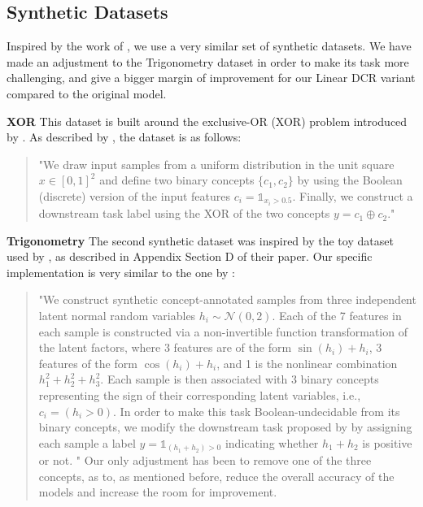 \documentclass[sigconf, nonacm]{acmart}
\begin{document}
\subsection{Synthetic Datasets}
\vspace{2pt}
Inspired by the work of \citet{barbiero2023interpretable}, we use a very similar set of synthetic datasets. We have made an adjustment to the Trigonometry dataset in order to make its task more challenging, and give a bigger margin of improvement for our Linear DCR variant compared to the original model. \vspace{8pt}

\textbf{XOR} This dataset is built around the exclusive-OR (XOR) problem introduced by \citet{minsky1969perceptrons}. As described by \citet{barbiero2023interpretable}, the dataset is as follows:
\begin{quote}
"We draw input samples from a uniform distribution in the unit square \( x \in [0, 1]^2 \) and define two binary concepts \(\{c_1, c_2\}\) by using the Boolean (discrete) version of the input features \( c_i = \mathbb{1}_{x_i > 0.5} \). Finally, we construct a downstream task label using the XOR of the two concepts \( y = c_1 \oplus c_2 \)."
\end{quote} \vspace{8pt}

\textbf{Trigonometry} The second synthetic dataset was inspired by the toy dataset used by \citet{mahinpei2021promisespitfallsblackboxconcept}, as described in Appendix Section D of their paper. Our specific implementation is very similar to the one by \citet{barbiero2023interpretable}:
\begin{quote}
"We construct synthetic concept-annotated samples from three independent latent normal random variables \( h_i \sim \mathcal{N}(0, 2) \). Each of the 7 features in each sample is constructed via a non-invertible function transformation of the latent factors, where 3 features are of the form \( \sin(h_i) + h_i \), 3 features of the form \( \cos(h_i) + h_i \), and 1 is the nonlinear combination \( h_1^2 + h_2^2 + h_3^2 \). Each sample is then associated with 3 binary concepts representing the sign of their corresponding latent variables, i.e., \( c_i = (h_i > 0) \). In order to make this task Boolean-undecidable from its binary concepts, we modify the downstream task proposed by \citet{mahinpei2021promisespitfallsblackboxconcept} by assigning each sample a label \( y = \mathbb{1}_{(h_1 + h_2) > 0} \) indicating whether \( h_1 + h_2 \) is positive or not.
"
Our only adjustment has been to remove one of the three concepts, as to, as mentioned before, reduce the overall accuracy of the models and increase the room for improvement.
\end{quote} \vspace{8pt}
\end{document}
